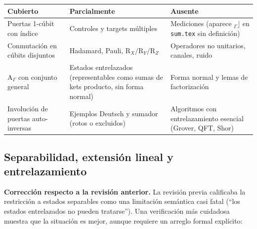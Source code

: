 \documentclass[12pt, a4paper]{article}
\newcommand{\gate}[1]{\text{#1}}
\begin{document}
\begin{longtable}{p{4cm} p{4cm} p{4.5cm}}
  \toprule
  \textbf{Cubierto}                      & \textbf{Parcialmente}                               & \textbf{Ausente}               \\
  \midrule
  Puertas 1-cúbit con índice             & Controles y targets múltiples                       & Mediciones
  (aparece $_{{\Gamma}}\rfloor$ en \texttt{sum.tex} sin definición)                                                             \\
  \addlinespace
  Conmutación en cúbits disjuntos        & Hadamard, Pauli, $\gate{R}_X/\gate{R}_Y/\gate{R}_Z$ &
  Operadores no unitarios, canales, ruido                                                                                       \\
  \addlinespace
  $\gate{A}_\Gamma$ con conjunto general & Estados entrelazados (representables como sumas de
  kets producto, sin forma normal)       & Forma normal y lemas de factorización                                                \\
  \addlinespace
  Involución de puertas auto-inversas    & Ejemplos Deutsch y sumador (rotos o excluidos)      & Algoritmos con entrelazamiento
  esencial (Grover, QFT, Shor)                                                                                                  \\
  \bottomrule
\end{longtable}

\subsection{Separabilidad, extensión lineal y entrelazamiento}
\label{sec:entrelazamiento}

\textbf{Corrección respecto a la revisión anterior.}
La revisión previa calificaba la restricción a estados separables como una
limitación semántica casi fatal (``los estados entrelazados no pueden
tratarse''). Una verificación más cuidadosa muestra que la situación es
mejor, aunque requiere un arreglo formal explícito:
\end{document}
